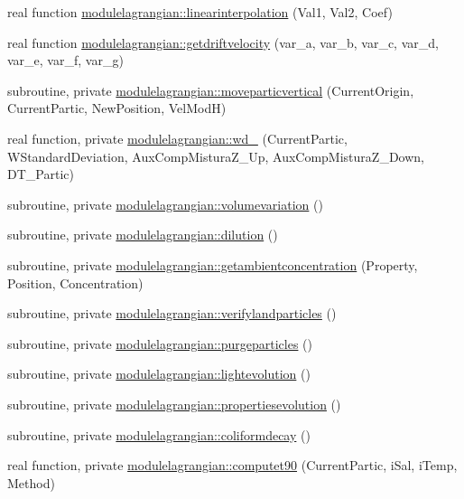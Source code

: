\begin{DoxyCompactItemize}
\item 
real function \mbox{\hyperlink{namespacemodulelagrangian_a0c6b41e19230933d9b189208e04909f1}{modulelagrangian\+::linearinterpolation}} (Val1, Val2, Coef)
\item 
real function \mbox{\hyperlink{namespacemodulelagrangian_a4fe5e7ff4efbd8464e9c64ac12f53a3c}{modulelagrangian\+::getdriftvelocity}} (var\+\_\+a, var\+\_\+b, var\+\_\+c, var\+\_\+d, var\+\_\+e, var\+\_\+f, var\+\_\+g)
\item 
subroutine, private \mbox{\hyperlink{namespacemodulelagrangian_aee1cf00f54feae6409c4674532876dcc}{modulelagrangian\+::moveparticvertical}} (Current\+Origin, Current\+Partic, New\+Position, Vel\+ModH)
\item 
real function, private \mbox{\hyperlink{namespacemodulelagrangian_a017fc1ab12cc04b5c4839d5ea0b54365}{modulelagrangian\+::wd\+\_\+}} (Current\+Partic, W\+Standard\+Deviation, Aux\+Comp\+Mistura\+Z\+\_\+\+Up, Aux\+Comp\+Mistura\+Z\+\_\+\+Down, D\+T\+\_\+\+Partic)
\item 
subroutine, private \mbox{\hyperlink{namespacemodulelagrangian_aac3ffc27a32f64e9bc13d06c25227655}{modulelagrangian\+::volumevariation}} ()
\item 
subroutine, private \mbox{\hyperlink{namespacemodulelagrangian_af886fd4c925246d6362ab14b2bfdcff1}{modulelagrangian\+::dilution}} ()
\item 
subroutine, private \mbox{\hyperlink{namespacemodulelagrangian_a379f0c8ed7aad4570a94ad678e1dea6e}{modulelagrangian\+::getambientconcentration}} (Property, Position, Concentration)
\item 
subroutine, private \mbox{\hyperlink{namespacemodulelagrangian_a96db0d2ce32abc9c42eea8890f665798}{modulelagrangian\+::verifylandparticles}} ()
\item 
subroutine, private \mbox{\hyperlink{namespacemodulelagrangian_a4ad3bdd3ff9c81a87e1b11eeea429acd}{modulelagrangian\+::purgeparticles}} ()
\item 
subroutine, private \mbox{\hyperlink{namespacemodulelagrangian_aba461e3f5d94c00b11072bae66f32060}{modulelagrangian\+::lightevolution}} ()
\item 
subroutine, private \mbox{\hyperlink{namespacemodulelagrangian_ad1d58143078dee3bc7c85e4ca9c03197}{modulelagrangian\+::propertiesevolution}} ()
\item 
subroutine, private \mbox{\hyperlink{namespacemodulelagrangian_a24e84b1ba147f10917d0d3cd3564d191}{modulelagrangian\+::coliformdecay}} ()
\item 
real function, private \mbox{\hyperlink{namespacemodulelagrangian_ab2c379c41effe9b3eef3129449039ace}{modulelagrangian\+::computet90}} (Current\+Partic, i\+Sal, i\+Temp, Method)

\end{DoxyCompactItemize}
